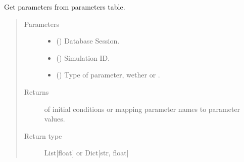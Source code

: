 \documentclass[a4paper,landscape,10pt,english]{sphinxmanual}
\begin{document}
\begin{fulllineitems}
\label{\detokenize{code_docs/simulation_API.model:simulation_API.model.crud._get_parameters}}
Get parameters from parameters table.
\begin{quote}\begin{description}
\item[{Parameters}] \leavevmode\begin{itemize}
\item {} 
 () \textendash{} Database Session.

\item {} 
 () \textendash{} Simulation ID.

\item {} 
 ({\hyperref[\detokenize{code_docs/simulation_API.controller:simulation_API.controller.schemas.ParamType}]{}}) \textendash{} Type of parameter, wether  or .

\end{itemize}

\item[{Returns}] \leavevmode
{} of initial conditions or  mapping parameter names to
parameter values.

\item[{Return type}] \leavevmode
List{[}float{]} or Dict{[}str, float{]}

\end{description}\end{quote}

\end{fulllineitems}
\end{document}
